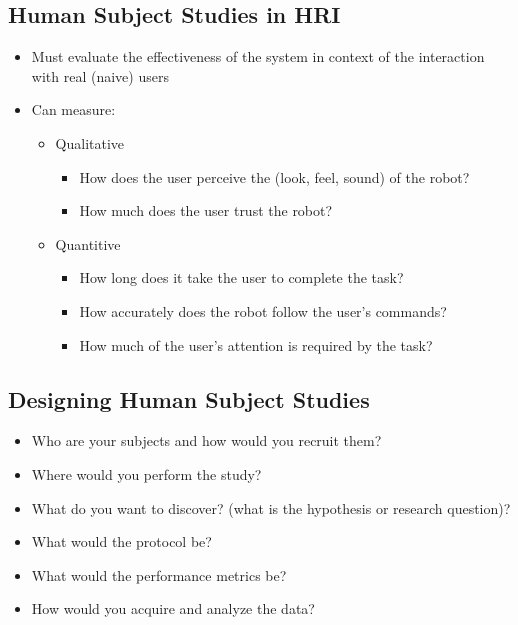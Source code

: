 \documentclass[10pt]{article}
\begin{document}
\subsection*{Human Subject Studies in HRI}
\begin{itemize}
	\item Must evaluate the effectiveness of the system in context of the interaction with real (naive) users
	\item Can measure:
	\begin{itemize}
        \item Qualitative
        \begin{itemize}
            \item How does the user perceive the (look, feel, sound) of the robot?
            \item How much does the user trust the robot?
        \end{itemize}
        \item Quantitive
        \begin{itemize}
            \item How long does it take the user to complete the task?
            \item How accurately does the robot follow the user's commands?
            \item How much of the user's attention is required by the task?
        \end{itemize}
    \end{itemize}
\end{itemize}

\subsection*{Designing Human Subject Studies}
\begin{itemize}
	\item Who are your subjects and how would you recruit them?
    \item Where would you perform the study?
    \item What do you want to discover? (what is the hypothesis or research question)?
    \item What would the protocol be?
    \item What would the performance metrics be?
    \item How would you acquire and analyze the data?    
\end{itemize}
\end{document}
